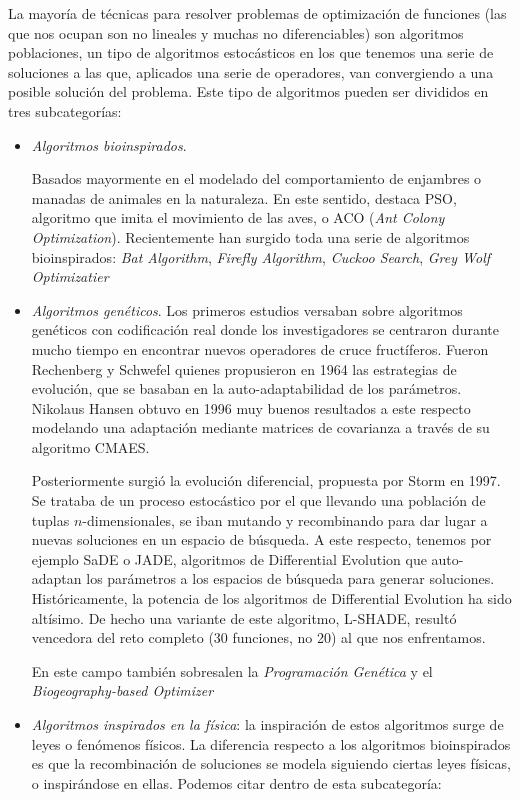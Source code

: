\documentclass[a4paper,11pt]{article}
\begin{document}
La mayoría de técnicas para resolver problemas de optimización de funciones (las que nos ocupan son no lineales y muchas no diferenciables)
son algoritmos poblaciones, un tipo de algoritmos estocásticos en los que tenemos una serie de soluciones a las que, aplicados una serie de
operadores, van convergiendo a una posible solución del problema. Este tipo de algoritmos pueden ser divididos en tres subcategorías:

\begin{itemize}
 \item \textit{Algoritmos bioinspirados}.
 
  Basados mayormente en el modelado del comportamiento de enjambres o manadas de animales
  en la naturaleza. En este sentido, destaca PSO, algoritmo que imita el movimiento de las aves, o ACO (\textit{Ant Colony
  Optimization}). Recientemente han surgido toda una serie de algoritmos bioinspirados: \textit{Bat Algorithm}, \textit{Firefly
  Algorithm}, \textit{Cuckoo Search}, \textit{Grey Wolf Optimizatier}
  
 \item \textit{Algoritmos genéticos}.
  Los primeros estudios versaban sobre algoritmos genéticos con codificación real donde los investigadores se centraron durante mucho tiempo en
  encontrar nuevos operadores de cruce fructíferos. Fueron Rechenberg y Schwefel quienes propusieron en 1964 las estrategias
  de evolución, que se basaban en la auto-adaptabilidad de los parámetros. Nikolaus Hansen obtuvo en 1996 muy buenos resultados
  a este respecto modelando una adaptación mediante matrices de covarianza a través de su algoritmo CMAES.
  
  Posteriormente surgió la evolución diferencial, propuesta por Storm en 1997. Se trataba de un proceso estocástico por el que
  llevando una población de tuplas $n$-dimensionales, se iban mutando y recombinando para dar lugar a nuevas soluciones en un espacio
  de búsqueda. A este respecto, tenemos por ejemplo SaDE o JADE, algoritmos de Differential Evolution que auto-adaptan los 
  parámetros a los espacios de búsqueda para generar soluciones. Históricamente, la potencia de los algoritmos de Differential
  Evolution ha sido altísimo. De hecho una variante de este algoritmo, L-SHADE, resultó vencedora del reto completo (30 funciones,
  no 20) al que nos enfrentamos.
  
  En este campo también sobresalen la \textit{Programación Genética} y el \textit{Biogeography-based Optimizer}

 \item \textit{Algoritmos inspirados en la física}: la inspiración de estos algoritmos surge de leyes o fenómenos físicos.
 La diferencia respecto a los algoritmos bioinspirados es que la recombinación de soluciones se modela siguiendo ciertas
 leyes físicas, o inspirándose en ellas. Podemos citar dentro de esta subcategoría:
 

\end{itemize}
\end{document}
